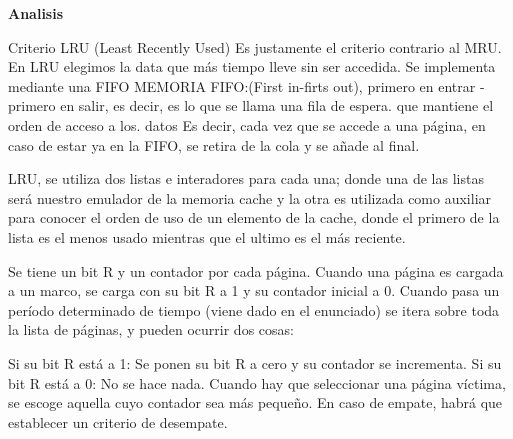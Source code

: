 \documentclass{report}
\begin{document}
\begin{titlepage}
{\bfseries\LARGE  Analisis \par}\par
\par
Criterio LRU (Least Recently Used)
Es justamente el criterio contrario al MRU. En LRU elegimos la data que más tiempo lleve sin ser accedida. Se implementa mediante una FIFO MEMORIA FIFO:(First in-firts out), primero en entrar - primero en salir, es decir, es lo que se llama una fila de espera. que mantiene el orden de acceso a los. datos Es decir, cada vez que se accede a una página, en caso de estar ya en la FIFO, se retira de la cola y se añade al final.

LRU, se utiliza dos listas e interadores para cada una; donde una de las listas será nuestro emulador de la memoria cache y la otra es utilizada como auxiliar para conocer el orden de uso de un elemento de la cache, donde el primero de la lista es el menos usado mientras que el ultimo es el más reciente.

Se tiene un bit R y un contador por cada página. Cuando una página es cargada a un marco, se carga con su bit R a 1 y su contador inicial a 0. Cuando pasa un período determinado de tiempo (viene dado en el enunciado) se itera sobre toda la lista de páginas, y pueden ocurrir dos cosas:

Si su bit R está a 1: Se ponen su bit R a cero y su contador se incrementa.
Si su bit R está a 0: No se hace nada.
Cuando hay que seleccionar una página víctima, se escoge aquella cuyo contador sea más pequeño. En caso de empate, habrá que establecer un criterio de desempate.

\end{titlepage}
\end{document}
